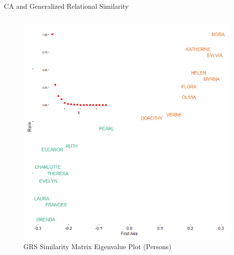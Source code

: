 \documentclass[
  ignorenonframetext,
]{beamer}
\begin{document}
\begin{frame}{CA and Generalized Relational Similarity}
\begin{columns}[T]
\begin{column}{0.5\textwidth}
\begin{figure}
{\centering \includegraphics{Plots/grs-plot-eigen-p.png}

}

\caption{GRS Similarity Matrix Eigenvalue Plot (Persons)}

\end{figure}
\end{column}
\end{columns}
\end{frame}
\end{document}
